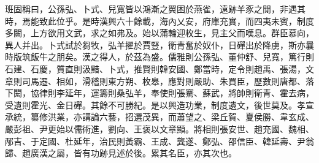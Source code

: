班固稱曰，公孫弘、卜式、兒寬皆以鴻漸之翼困於燕雀，遠跡羊豕之閒，非遇其時，焉能致此位乎。是時漢興六十餘載，海內乂安，府庫充實，而四夷未賓，制度多闕，上方欲用文武，求之如弗及。始以蒲輪迎枚生，見主父而嘆息。群臣慕向，異人并出。卜式試於芻牧，弘羊擢於賈豎，衛青奮於奴仆，日磾出於降虜，斯亦曩時版筑飯牛之朋矣。漢之得人，於茲為盛。儒雅則公孫弘、董仲舒、兒寬，篤行則石建、石慶，質直則汲黯、卜式，推賢則韓安國、鄭當時，定令則趙禹、張湯，文章則司馬遷、相如，滑稽則東方朔、枚皋，應對則嚴助、朱買臣，歷數則唐都、落下閎，協律則李延年，運籌則桑弘羊，奉使則張騫、蘇武，將帥則衛青、霍去病，受遺則霍光、金日磾。其餘不可勝紀。是以興造功業，制度遺文，後世莫及。孝宣承統，纂修洪業，亦講論六藝，招選茂異，而蕭望之、梁丘賀、夏侯勝、韋玄成、嚴彭祖、尹更始以儒術進，劉向、王褒以文章顯。將相則張安世、趙充國、魏相、邴吉、于定國、杜延年，治民則黃霸、王成、龔遂、鄭弘、邵信臣、韓延壽、尹翁歸、趙廣漢之屬，皆有功跡見述於後。累其名臣，亦其次也。